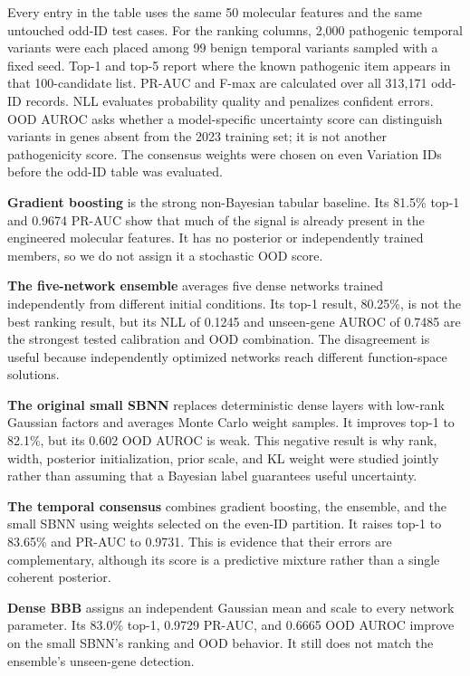 \documentclass[11pt]{article}
\begin{document}
Every entry in the table uses the same 50 molecular features and the same untouched odd-ID test cases. For the ranking columns, 2,000 pathogenic temporal variants were each placed among 99 benign temporal variants sampled with a fixed seed. Top-1 and top-5 report where the known pathogenic item appears in that 100-candidate list. PR-AUC and F-max are calculated over all 313,171 odd-ID records. NLL evaluates probability quality and penalizes confident errors. OOD AUROC asks whether a model-specific uncertainty score can distinguish variants in genes absent from the 2023 training set; it is not another pathogenicity score. The consensus weights were chosen on even Variation IDs before the odd-ID table was evaluated.

\textbf{Gradient boosting} is the strong non-Bayesian tabular baseline. Its 81.5\% top-1 and 0.9674 PR-AUC show that much of the signal is already present in the engineered molecular features. It has no posterior or independently trained members, so we do not assign it a stochastic OOD score.

\textbf{The five-network ensemble} averages five dense networks trained independently from different initial conditions. Its top-1 result, 80.25\%, is not the best ranking result, but its NLL of 0.1245 and unseen-gene AUROC of 0.7485 are the strongest tested calibration and OOD combination. The disagreement is useful because independently optimized networks reach different function-space solutions.

\textbf{The original small SBNN} replaces deterministic dense layers with low-rank Gaussian factors and averages Monte Carlo weight samples. It improves top-1 to 82.1\%, but its 0.602 OOD AUROC is weak. This negative result is why rank, width, posterior initialization, prior scale, and KL weight were studied jointly rather than assuming that a Bayesian label guarantees useful uncertainty.

\textbf{The temporal consensus} combines gradient boosting, the ensemble, and the small SBNN using weights selected on the even-ID partition. It raises top-1 to 83.65\% and PR-AUC to 0.9731. This is evidence that their errors are complementary, although its score is a predictive mixture rather than a single coherent posterior.

\textbf{Dense BBB} assigns an independent Gaussian mean and scale to every network parameter. Its 83.0\% top-1, 0.9729 PR-AUC, and 0.6665 OOD AUROC improve on the small SBNN's ranking and OOD behavior. It still does not match the ensemble's unseen-gene detection.
\end{document}

